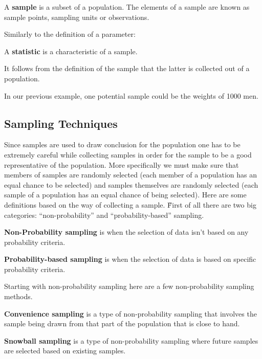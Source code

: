 \bd[Sample]
A \textbf{sample} is a subset of a population. The elements of a sample are known as sample points, sampling units or
observations.
\ed

\vspace{-15pt}


\vspace{-15pt}

Similarly to the definition of a parameter:

\bd[Statistic]
A \textbf{statistic} is a characteristic of a sample.
\ed

It follows from the definition of the sample that the latter is collected out of a population.

\be
In our previous example, one potential sample could be the weights of 1000 men.
\ee

\subsection{Sampling Techniques}

Since samples are used to draw conclusion for the population one has to be extremely careful while collecting samples
in order for the sample to be a good representative of the population. More specifically we must make sure that
members of samples are randomly selected (each member of a population has an equal chance to be selected) and samples
themselves are randomly selected (each sample of a population has an equal chance of being selected). Here are some
definitions based on the way of collecting a sample. \v

First of all there are two big categories: ``non-probability'' and ``probability-based'' sampling.

\textbf{Non-Probability sampling} is when the selection of data isn't based on any probability criteria.
\ed

\textbf{Probability-based sampling} is when the selection of data is based on specific probability criteria.
\ed

Starting with non-probability sampling here are a few non-probability sampling methods.

\textbf{Convenience sampling} is a type of non-probability sampling that involves the sample being drawn from that
part of the population that is close to hand.
\ed

\textbf{Snowball sampling} is a type of non-probability sampling where future samples are selected based on existing
samples.
\ed

